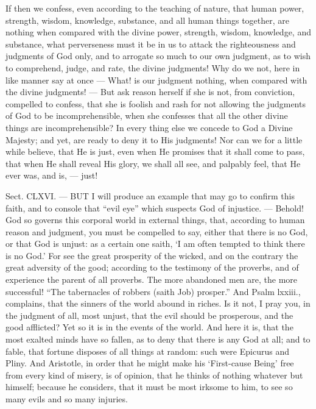 If then we confess, even according to the teaching of nature, that human power, strength, wisdom, knowledge, substance, and all human things together, are nothing when compared with the divine power, strength, wisdom, knowledge, and substance, what perverseness must it be in us to attack the righteousness and judgments of God only, and to arrogate so much to our own judgment, as to wish to comprehend, judge, and rate, the divine judgments! Why do we not, here in like manner say at once — What! is our judgment nothing, when compared with the divine judgments! — But ask reason herself if she is not, from conviction, compelled to confess, that she is foolish and rash for not allowing the judgments of God to be incomprehensible, when she confesses that all the other divine things are incomprehensible? In every thing else we concede to God a Divine Majesty; and yet, are ready to deny it to His judgments! Nor can we for a little while believe, that He is just, even when He promises that it shall come to pass, that when He shall reveal His glory, we shall all see, and palpably feel, that He ever was, and is, — just!


Sect. CLXVI. — BUT I will produce an example that may go to confirm this faith, and to console that “evil eye” which suspects God of injustice. — Behold! God so governs this corporal world in external things, that, according to human reason and judgment, you must be compelled to say, either that there is no God, or that God is unjust: as a certain one saith, ‘I am often tempted to think there is no God.’ For see the great prosperity of the wicked, and on the contrary the great adversity of the good; according to the testimony of the proverbs, and of experience the parent of all proverbs. The more abandoned men are, the more successful! “The tabernacles of robbers (saith Job) prosper.” And Psalm lxxiii., complains, that the sinners of the world abound in riches. Is it not, I pray you, in the judgment of all, most unjust, that the evil should be prosperous, and the good afflicted? Yet so it is in the events of the world. And here it is, that the most exalted minds have so fallen, as to deny that there is any God at all; and to fable, that fortune disposes of all things at random: such were Epicurus and Pliny. And Aristotle, in order that he might make his ‘First-cause Being’ free from every kind of misery, is of opinion, that he thinks of nothing whatever but himself; because he considers, that it must be most irksome to him, to see so many evils and so many injuries.

